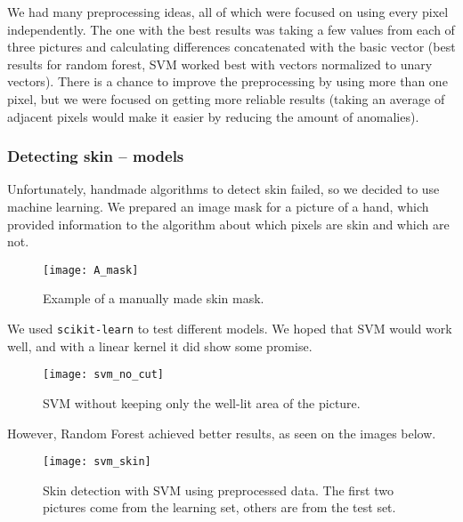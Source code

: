                 We had many preprocessing ideas, all of which were focused
                on using every pixel independently.
                The one with the best results was taking a few values from each of three pictures
                and calculating differences concatenated with the basic vector (best results for
                random forest, SVM worked best with vectors normalized to unary vectors).
                There is a chance to improve the preprocessing by using more than one pixel,
                but we were focused on getting more reliable results
                (taking an average of adjacent pixels would make it easier
                by reducing the amount of anomalies).

            \subsubsection*{Detecting skin -- models}
                Unfortunately, handmade algorithms to detect skin failed,
                so we decided to use machine learning.
                We prepared an image mask for a picture of a hand,
                which provided information to the algorithm
                about which pixels are skin and which are not.

                \begin{figure}[H]
                    \caption{Example of a manually made skin mask.}
                    \centering
                    \texttt{[image: A\_mask]}
                    \label{fig:A_mask}
                \end{figure}

                We used \texttt{scikit-learn} to test different models.
                We hoped that SVM would work well, and with a
                linear kernel it did show some promise.

                 \begin{figure}[H]
                    \caption{SVM without keeping only the well-lit area of the picture.}
                    \centering
                    \texttt{[image: svm\_no\_cut]}
                    \label{fig:svm_no_cut}
                \end{figure}

                However, Random Forest achieved better results, as seen on the
                images below.

                  \begin{figure}[H]
                    \caption{Skin detection with SVM using preprocessed data.
                    The first two pictures come from the learning set, others
                    are from the test set.}
                    \centering
                    \texttt{[image: svm\_skin]}
                    \label{fig:svm_good}
                \end{figure}


